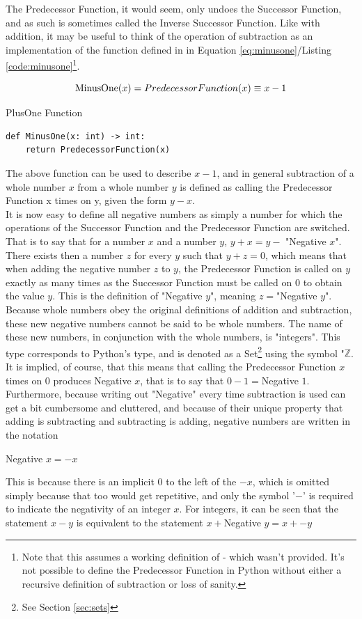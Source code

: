 The Predecessor Function, it would seem, only undoes the Successor Function, and as such is sometimes called the Inverse Successor Function. Like with addition, it may be useful to think of the operation of subtraction as an implementation of the function defined in in Equation \ref{eq:minusone}/Listing \ref{code:minusone}\footnote{Note that this assumes a working definition of  - which wasn't provided. It's not possible to define the Predecessor Function in Python without either a recursive definition of subtraction or loss of sanity.}.

\begin{equation}\label{eq:minusone}
\textnormal{MinusOne}(x) = PredecessorFunction(x) \equiv x-1
\end{equation}
\begin{listing}[H]
\caption{PlusOne Function}\label{code:minusone}
\begin{verbatim}
def MinusOne(x: int) -> int:
	return PredecessorFunction(x)
\end{verbatim}
\end{listing}
The above function can be used to describe $x-1$, and in general subtraction of a whole number $x$ from a whole number $y$ is defined as calling the Predecessor Function x times on y, given the form $y-x$. \\
It is now easy to define all negative numbers as simply a number for which the operations of the Successor Function and the Predecessor Function are switched. That is to say that for a number $x$ and a number $y$, $y+x=y-$ "Negative $x$". There exists then a number $z$ for every $y$ such that $y+z=0$, which means that when adding the negative number $z$ to $y$, the Predecessor Function is called on $y$ exactly as many times as the Successor Function must be called on $0$ to obtain the value $y$. This is the definition of "Negative $y$", meaning $z=$"Negative $y$".\\
Because whole numbers obey the original definitions of addition and subtraction, these new negative numbers cannot be said to be whole numbers. The name of these new numbers, in conjunction with the whole numbers, is "integers". This type corresponds to Python's  type, and is denoted as a Set\footnote{See Section \ref{sec:sets}} using the symbol "$\mathbb{Z}$. \\
It is implied, of course, that this means that calling the Predecessor Function $x$ times on $0$ produces Negative $x$, that is to say that $0-1=$Negative $1$. Furthermore, because writing out "Negative" every time subtraction is used can get a bit cumbersome and cluttered, and because of their unique property that adding is subtracting and subtracting is adding, negative numbers are written in the notation
\begin{center}
Negative $x = -x$
\end{center}
This is because there is an implicit $0$ to the left of the $-x$, which is omitted simply because that too would get repetitive, and only the symbol '$-$' is required to indicate the negativity of an integer $x$. For integers, it can be seen that the statement $x-y$ is equivalent to the statement $x+$Negative $y = x+ -y$

